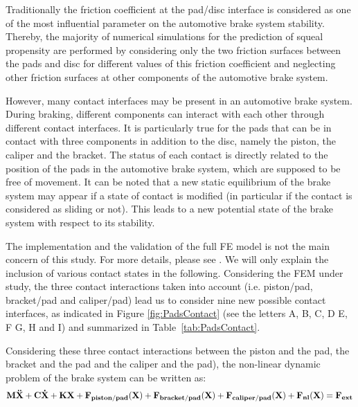 \documentclass[final,1p]{elsarticle}
\begin{document}
Traditionally the friction coefficient at the pad/disc interface is considered as one of the most influential parameter on the automotive brake system stability. Thereby, the majority of numerical simulations for the prediction of squeal propensity are performed by considering only the two friction surfaces between the pads and disc for different values of this friction coefficient and neglecting other friction surfaces at other components of the automotive brake system.

However, many contact interfaces may be present in an automotive brake system. During braking, different components can interact with each other through different contact interfaces. It is particularly true for the pads that can be in contact with three components in addition to the disc, namely the piston, the caliper and the bracket. The status of each contact is directly related to the position of the pads in the automotive brake system, which are supposed to be free of movement. It can be noted that a new static equilibrium of the brake system may appear if a state of contact is modified (in particular if the contact is considered as sliding or not). This leads to a new potential state of the brake system with respect to its stability. 

The implementation and the validation of the full FE model is not the main concern of this study. For more details, please see \cite{AAA}. We will only explain the inclusion of various contact states in the following. Considering the FEM under study, the three contact interactions taken into account (i.e. piston/pad, bracket/pad and caliper/pad) lead us to consider nine new possible contact interfaces, as indicated in Figure \ref{fig:PadsContact} (see the letters A, B, C, D E, F G, H and I) and summarized in Table~\ref{tab:PadsContact}. 

Considering these three contact interactions between the piston and the pad, the bracket and the pad and the caliper and the pad), the non-linear dynamic problem of the brake system can be written as:
\begin{equation}
\bf{M}\ddot{\textbf{X}} + \bf{C}\dot{\textbf{X}} + \bf{KX} +  \bf{F}_{piston/pad}(\bf{X}) + \bf{F}_{bracket/pad}(\bf{X})+ \bf{F}_{caliper/pad}(\bf{X}) + \textbf{F}_{nl}(\textbf{X}) = \bf{F}_{ext} 
\label{eq:eq1}
\end{equation}
\end{document}
